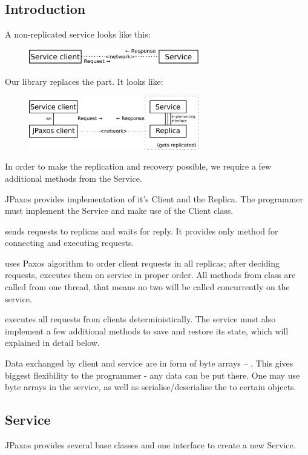 \subsection{Introduction}
\label{api:introduction}
A non-replicated service looks like this:
\begin{figure}[H]
\centering
\includegraphics[width=20em]{user_guide/api_sm.pdf}
\end{figure}

\noindent\ignorespaces Our library replaces the  part. It looks like:
\begin{figure}[H]
\centering
\includegraphics[width=20em]{user_guide/api_jpaxos.pdf}
\end{figure}

In order to make the replication and recovery possible, we require a few additional methods from the Service.

JPaxos provides implementation of it's Client and the Replica. The programmer must implement the Service and make use of the Client class.

 sends requests to replicas and waits for reply. It provides only method for connecting and executing requests.

 uses Paxos algorithm to order client requests in all replicas; after deciding requests, executes them on service in proper order. All methods from  class are called from one  thread, that means no two will be called concurrently on the service.

 executes all requests from clients deterministically. The service must also implement a few additional methods to save and restore its state, which will explained in detail below.

Data exchanged by client and service are in form of byte arrays -- . This gives biggest flexibility to the programmer - any data can be put there. One may use byte arrays in the service, as well as serialise/deserialise the  to certain objects.


\subsection{Service}
\label{api:service}
JPaxos provides several base classes and one interface to create a new Service.

